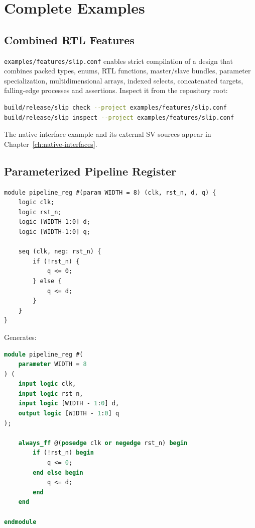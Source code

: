 \documentclass[lang=en,11pt]{elegantbook}
\newcommand{\code}[1]{\texttt{#1}}
\begin{document}
\chapter{Complete Examples}

\section{Combined RTL Features}

\code{examples/features/slip.conf} enables strict compilation of a design that
combines packed types, enums, RTL functions, master/slave bundles, parameter
specialization, multidimensional arrays, indexed selects, concatenated targets,
falling-edge processes and assertions. Inspect it from the repository root:

\begin{lstlisting}[language=bash]
build/release/slip check --project examples/features/slip.conf
build/release/slip inspect --project examples/features/slip.conf
\end{lstlisting}



The native interface example and its external SV sources appear in
Chapter~\ref{ch:native-interfaces}.

\section{Parameterized Pipeline Register}

\begin{lstlisting}[language=Slip]
module pipeline_reg #(param WIDTH = 8) (clk, rst_n, d, q) {
    logic clk;
    logic rst_n;
    logic [WIDTH-1:0] d;
    logic [WIDTH-1:0] q;

    seq (clk, neg: rst_n) {
        if (!rst_n) {
            q <= 0;
        } else {
            q <= d;
        }
    }
}
\end{lstlisting}

Generates:

\begin{lstlisting}[language=SystemVerilog]
module pipeline_reg #(
    parameter WIDTH = 8
) (
    input logic clk,
    input logic rst_n,
    input logic [WIDTH - 1:0] d,
    output logic [WIDTH - 1:0] q
);

    always_ff @(posedge clk or negedge rst_n) begin
        if (!rst_n) begin
            q <= 0;
        end else begin
            q <= d;
        end
    end

endmodule
\end{lstlisting}
\end{document}
